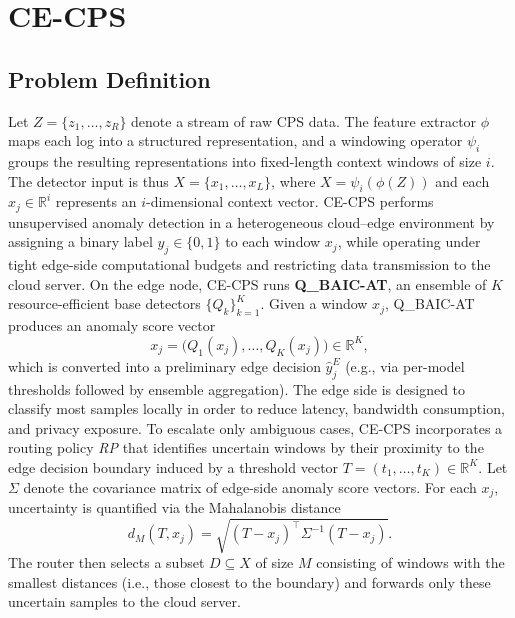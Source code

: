 \documentclass[pdflatex,sn-mathphys-num]{sn-jnl}%
\theoremstyle{thmstyleone}
\theoremstyle{thmstyletwo}%
\theoremstyle{thmstylethree}%
\begin{document}
\section{CE-CPS}\label{sec: method}
\subsection{Problem Definition}
Let $Z=\{z_1,\dots,z_R\}$ denote a stream of raw CPS data. The feature extractor $\phi$ maps each log into a structured representation, and a windowing operator $\psi_i$ groups the resulting representations into fixed-length context windows of size $i$. The detector input is thus
$X=\{x_1,\dots,x_L\}$, where $X=\psi_i(\phi(Z))$ and each $x_j\in\mathbb{R}^i$ represents an $i$-dimensional context vector. CE-CPS performs unsupervised anomaly detection in a heterogeneous cloud--edge environment by assigning a binary label $\hat{y}_j\in\{0,1\}$ to each window $x_j$, while operating under tight edge-side computational budgets and restricting data transmission to the cloud server.
On the edge node, CE-CPS runs \textbf{Q\_BAIC-AT}, an ensemble of $K$ resource-efficient base detectors $\{Q_k\}_{k=1}^K$. Given a window $x_j$, Q\_BAIC-AT produces an anomaly score vector
\[
x_j=\big(Q_1(x_j),\dots,Q_K(x_j)\big)\in\mathbb{R}^K,
\]
which is converted into a preliminary edge decision $\hat{y}^{E}_j$ (e.g., via per-model thresholds followed by ensemble aggregation). The edge side is designed to classify most samples locally in order to reduce latency, bandwidth consumption, and privacy exposure. To escalate only ambiguous cases, CE-CPS incorporates a routing policy \textit{RP} that identifies uncertain windows by their proximity to the edge decision boundary induced by a threshold vector $T=(t_1,\dots,t_K)\in\mathbb{R}^K$. Let $\Sigma$ denote the covariance matrix of edge-side anomaly score vectors. For each $x_j$, uncertainty is quantified via the Mahalanobis distance
\[
d_M(T,x_j)=\sqrt{(T-x_j)^\top \Sigma^{-1}(T-x_j)}.
\]
The router then selects a subset $D\subseteq X$ of size $M$ consisting of windows with the smallest distances (i.e., those closest to the boundary) and forwards only these uncertain samples to the cloud server.
\end{document}
